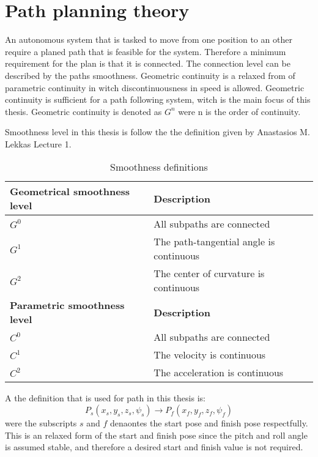 \chapter{Path planning theory}
An autonomous system that is tasked to move from one position to an other require a planed path that is feasible for the system. Therefore a minimum requirement for the plan is that it is connected. The connection level can be described by the paths smoothness. Geometric continuity is a relaxed from of parametric continuity in witch discontinuousness in speed is allowed. Geometric continuity is sufficient for a path following system, witch is the main focus of this thesis. Geometric continuity is denoted as $G^n$ were n is the order of continuity.

Smoothness level in this thesis is follow the the definition given by Anastasios M. Lekkas Lecture 1.

\begin{table}[H]
\begin{center}
\begin{tabular}{| l | | l |}
\hline
\textbf{Geometrical smoothness level} & \textbf{Description} \\ \hline
$G^0$ & All subpaths are connected \\ \hline
$G^1$ & The path-tangential angle is continuous \\ \hline
$G^2$ & The center of curvature is continuous \\ \hline
\textbf{Parametric smoothness level} & \textbf{Description} \\ \hline
$C^0$ & All subpaths are connected \\ \hline
$C^1$ & The velocity is continuous \\ \hline
$C^2$ & The acceleration is continuous
\end{tabular}
\end{center}
\caption{Smoothness definitions}
\label{TB:SmoothnessDescriptions}
\end{table} 

A the definition that is used for path in this thesis is:
\begin{equation}
P_s(x_s,y_s,z_s,\psi_s) \rightarrow P_f(x_f,y_f,z_f,\psi_f)
\end{equation}
were the subscripts $s$ and $f$ denaontes the start pose and finish pose respectfully. This is an relaxed form of the start and finish pose since the pitch and roll angle is assumed stable, and therefore a desired start and finish value is not required.

